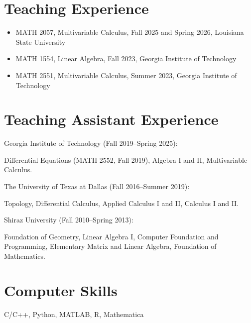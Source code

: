\documentclass[11pt]{article}
\newenvironment{innerlist}[1][\enskip\textbullet]
        {\begin{compactitem}[#1]}{\end{compactitem}}
\begin{document}
\section{Teaching Experience}
\begin{itemize}
\vspace{0.1in}

\item MATH 2057, Multivariable Calculus, Fall 2025 and Spring 2026, Louisiana State University

\item MATH 1554, Linear Algebra, Fall 2023, Georgia Institute of Technology

\item MATH 2551, Multivariable Calculus, Summer 2023, Georgia Institute of Technology

\end{itemize}


\section{Teaching Assistant Experience}

\begin{innerlist}

\item Georgia Institute of Technology (Fall 2019--Spring 2025):
\begin{innerlist}[-]
\item Differential Equations (MATH 2552, Fall 2019), Algebra I and II, Multivariable Calculus.
\end{innerlist}
\item The University of Texas at Dallas (Fall 2016--Summer 2019):
\begin{innerlist}[-]
\item Topology, Differential Calculus, Applied Calculus I and II, Calculus I and II.
\end{innerlist}
\item Shiraz University (Fall 2010--Spring 2013):
\begin{innerlist}[-]
\item Foundation of Geometry, Linear Algebra I, Computer Foundation and Programming, Elementary Matrix and Linear Algebra, Foundation of Mathematics.
\end{innerlist}

\end{innerlist}


\section{Computer Skills}
\vspace{2 mm}
\begin{innerlist}
\item{C/C++, Python, MATLAB, R, Mathematica}
\end{innerlist}
\end{document}
